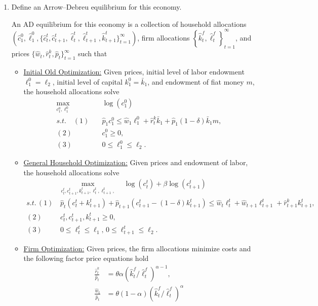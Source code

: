 \documentclass[11pt,english]{article}
\begin{document}
\begin{enumerate}
    \item[b)] Define an Arrow--Debreu equilibrium for this economy.
    \begin{solution}
 An AD equilibrium for this economy is a collection of household allocations $\left(\hat{c}_1^0, \hat{\ell}_1^0, \{\hat{c}_t^t, \hat{c}_{t+1}^t, \hat{\ell}_t^t, \hat{\ell}_{t+1}^t, \hat{k}_{t+1}^t\}_{t=1}^\infty\right)$, firm allocations $\left\{\hat{k}_t^f, \hat{\ell}_t^f\right\}_{t = 1}^\infty$, and prices $\{\hat{w}_t, \hat{r}_t^k, \hat{p}_t\}_{t=1}^\infty$ such that
\begin{itemize}
\item \underline{Initial Old Optimization:} Given prices, initial level of labor endowment $\ell_1^0 = \ell_2$, initial level of capital $k_1^0 = \bar{k}_1$, and endowment of fiat money $m$, the household allocations solve
\begin{align*}
\max_{c_1^0, \ell_1^0}&\quad \log(c_1^0)\\
s.t.\quad (1)&\quad \hat{p}_1c_1^0 \leq \hat{w}_1\ell_1^0 + \hat{r}_t^k\bar{k}_1 + \hat{p}_1(1 - \delta) \bar{k}_1 m,\\
(2)&\quad c_1^0 \geq 0,\\
(3)&\quad 0 \leq \ell_1^0 \leq \ell_2.
\end{align*}
\item \underline{General Household Optimization:} Given prices and endowment of labor, the household allocations solve
\begin{align*}
&\max_{c_t^t, c_{t+1}^t, k_{t+1}^t, \ell_t^t, \ell_{t+1}^t, }\quad \log(c_t^t) + \beta \log(c_{t+1}^t)\\
s.t.\, (1)&\, \hat{p}_t(c_t^t + k_{t+1}^t) + \hat{p}_{t+1}(c_{t+1}^t - (1 - \delta)k_{t+1}^t)  \leq \hat{w}_t \ell_t^t + \hat{w}_{t+1} \ell_{t+1}^t + \hat{r}_{t+1}^k k_{t+1}^t,\\
(2)&\, c_t^t, c_{t+1}^t, k_{t+1}^t \geq 0,\\
(3)&\, 0 \leq \ell_t^t \leq \ell_1,\, 0 \leq \ell_{t+1}^t \leq \ell_2.
\end{align*}
\item \underline{Firm Optimization:} Given prices, the firm allocations minimize costs and the following factor price equations hold
\begin{align*}
\frac{\hat{r}_t^k}{\hat{p}_t} &= \theta \alpha \left(\hat{k}_t^f / \hat{\ell}_t^f\right)^{\alpha - 1},\\
\frac{\hat{w}_t}{\hat{p}_t} &= \theta (1 - \alpha)\left(\hat{k}_t^f / \hat{\ell}_t^f\right)^{\alpha}
\end{align*}

\end{itemize}
\end{solution}
\end{enumerate}
\end{document}
